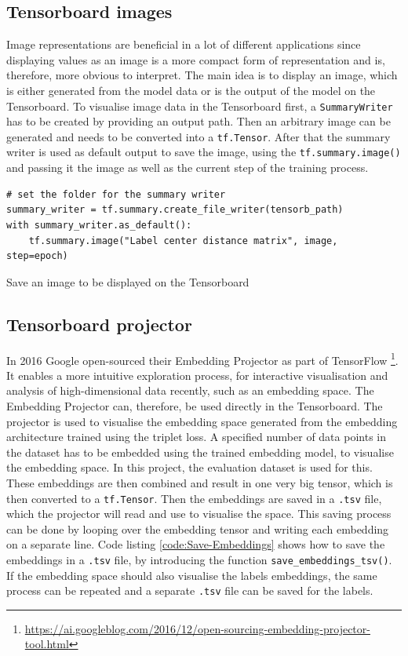 \subsection{Tensorboard images}
\label{sub:Tensorboard-Images}
Image representations are beneficial in a lot of different applications since displaying values as an image is a more compact form of representation and is, therefore, more obvious to interpret. The main idea is to display an image, which is either generated from the model data or is the output of the model on the Tensorboard. To visualise image data in the Tensorboard first, a \texttt{SummaryWriter} has to be created by providing an output path. Then an arbitrary image can be generated and needs to be converted into a \texttt{tf.Tensor}. After that the summary writer is used as default output to save the image, using the \texttt{tf.summary.image()} and passing it the image as well as the current step of the training process.

\begin{code}[htbp]
\begin{verbatim}
# set the folder for the summary writer
summary_writer = tf.summary.create_file_writer(tensorb_path)
with summary_writer.as_default():
    tf.summary.image("Label center distance matrix", image, step=epoch)
\end{verbatim}
\caption{Save an image to be displayed on the Tensorboard}
\label{code:Summary-Image}
\end{code}

\subsection{Tensorboard projector}
\label{sub:Tensorboard-Projector}
In 2016 Google open-sourced their Embedding Projector as part of TensorFlow \footnote{\url{https://ai.googleblog.com/2016/12/open-sourcing-embedding-projector-tool.html}}. It enables a more intuitive exploration process, for interactive visualisation and analysis of high-dimensional data recently, such as an embedding space. The Embedding Projector can, therefore, be used directly in the Tensorboard. The projector is used to visualise the embedding space generated from the embedding architecture trained using the triplet loss.
\newline
\newline
A specified number of data points in the dataset has to be embedded using the trained embedding model, to visualise the embedding space. In this project, the evaluation dataset is used for this. These embeddings are then combined and result in one very big tensor, which is then converted to a \texttt{tf.Tensor}. Then the embeddings are saved in a \texttt{.tsv} file, which the projector will read and use to visualise the space. This saving process can be done by looping over the embedding tensor and writing each embedding on a separate line. Code listing \ref{code:Save-Embeddings} shows how to save the embeddings in a \texttt{.tsv} file, by introducing the function \texttt{save\_embeddings\_tsv()}. If the embedding space should also visualise the labels embeddings, the same process can be repeated and a separate \texttt{.tsv} file can be saved for the labels.

